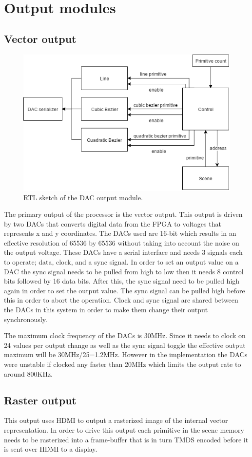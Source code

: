 \chapter{Output modules}
\label{chap:Output}

\section{Vector output}

\begin{figure}[h!]
    \includegraphics[width=\linewidth]{images/dac-output.png}
    \caption{RTL sketch of the \vthreek DAC output module.}
    \label{fig:dac-output}
\end{figure}

The primary output of the processor is the vector output.
This output is driven by two DACs that converts digital data from the FPGA to voltages that represents x and y coordinates.
The DACs used are 16-bit which results in an effective resolution of 65536 by 65536 without taking into account the noise on the output voltage.
These DACs have a serial interface and needs 3 signals each to operate; data, clock, and a sync signal.
In order to set an output value on a DAC the sync signal needs to be pulled from high to low then it needs 8 control bits followed by 16 data bits.
After this, the sync signal need to be pulled high again in order to set the output value.
The sync signal can be pulled high before this in order to abort the operation.
Clock and sync signal are shared between the DACs in this system in order to make them change their output synchronously.

The maximum clock frequency of the DACs is 30MHz. 
Since it needs to clock on 24 values per output change as well as the sync signal toggle the effective output maximum will be 30MHz/25=1.2MHz.
However in the implementation the DACs were unstable if clocked any faster than 20MHz which limits the output rate to around 800KHz.

\section{Raster output}

This output uses HDMI to output a rasterized image of the internal vector representation.
In order to drive this output each primitive in the scene memory needs to be rasterized into a frame-buffer that is in turn TMDS encoded before it is sent over HDMI to a display.
